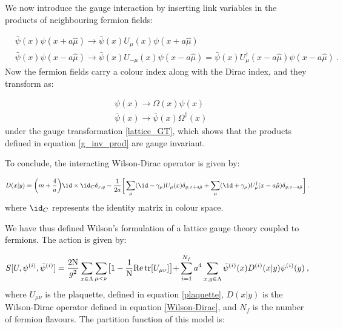 We now introduce the gauge interaction by inserting link variables in the products of neighbouring fermion fields:

\begin{equation}
\begin{split}
& \bar \psi(x) \psi(x + a \hat\mu) \to \bar \psi(x) U_{\mu}(x) \psi(x + a \hat\mu)\\
& \bar \psi(x) \psi(x - a \hat\mu) \to \bar \psi(x) U_{-\mu}(x) \psi(x - a \hat\mu) = \bar \psi(x) U_{\mu}^{\dagger}(x - a\hat\mu) \psi(x - a \hat\mu) \: .
\end{split}
\label{g_inv_prod}
\end{equation}
%
Now the fermion fields carry a colour index  along with the Dirac index, and they transform as: 

\begin{equation}
\begin{split}
&\psi(x) \to \Omega(x) \psi(x) \\
&\bar\psi(x) \to \bar\psi(x) \Omega^{\dagger}(x)
\end{split}
\end{equation}
%
under the gauge transformation \ref{lattice_GT}, which shows that the products defined in equation \ref{g_inv_prod} are gauge invariant.

To conclude, the interacting Wilson-Dirac operator is given by:

\begin{equation}
D(x \vert y) = \biggl( m + \frac{4}{a}  \biggr)\id \times \id_C   \delta_{x,y} - \frac{1}{2a}  \biggr[ \sum_{\mu}(\id-\gamma_{\mu}) U_{\mu}(x) \delta_{y,x+a\hat\mu} + \sum_{\mu}(\id+\gamma_{\mu}) U_{\mu}^{\dagger}(x -a \hat\mu) \delta_{y,x-a\hat\mu} \biggl] \: .
\label{Wilson-Dirac}
\end{equation}
%
where $\id_C$ represents the identity matrix in colour space.

\bigskip

We have thus defined Wilson's formulation of a lattice gauge theory coupled to fermions. The action is given by:

\begin{equation}
S[U,\psi^{(i)}, \bar\psi^{(i)}] =  \frac{2 \mathrm N}{g^2} \sum_{x \in \Lambda}  \sum_{\mu < \nu} \bigr[  1 - \frac{1}{\mathrm{N}} \mathrm{Re} \tr  [U_{\mu \nu}] \bigl ] + \sum_{i=1}^{N_f} a^4 \sum_{x,y \in \Lambda} \bar\psi^{(i)}(x) D^{(i)}(x \vert y)\psi^{(i)}(y) \: ,
\label{lattice_action}
\end{equation}
%
where $U_{\mu\nu}$ is the plaquette, defined in equation \ref{plaquette}, $D(x \vert y)$ is the Wilson-Dirac operator defined in equation \ref{Wilson-Dirac}, and $N_f$ is the number of fermion flavours.
The partition function of this model is:

